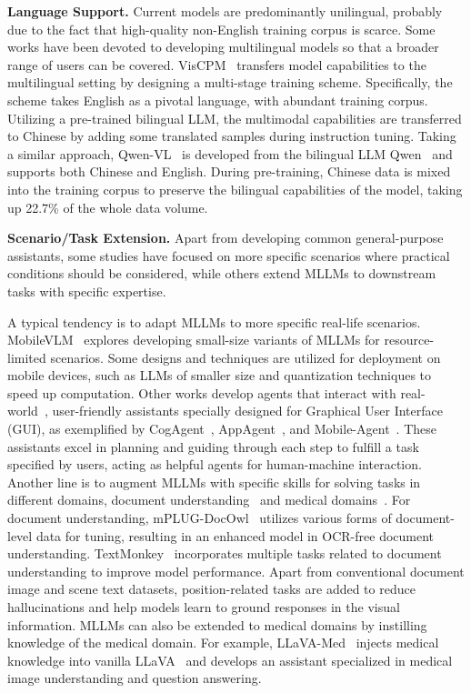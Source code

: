 \noindent \textbf{Language Support.}
Current models are predominantly unilingual, probably due to the fact that high-quality non-English training corpus is scarce. Some works have been devoted to developing multilingual models so that a broader range of users can be covered.
VisCPM~\cite{hu2023large} transfers model capabilities to the multilingual setting by designing a multi-stage training scheme. Specifically, the scheme takes English as a pivotal language, with abundant training corpus. Utilizing a pre-trained bilingual LLM, the multimodal capabilities are transferred to Chinese by adding some translated samples during instruction tuning. 
Taking a similar approach, Qwen-VL~\cite{bai2023qwen} is developed from the bilingual LLM Qwen~\cite{qwen-lm} and supports both Chinese and English. During pre-training, Chinese data is mixed into the training corpus to preserve the bilingual capabilities of the model, taking up 22.7\% of the whole data volume.


\noindent \textbf{Scenario/Task Extension.}
Apart from developing common general-purpose assistants, some studies have focused on more specific scenarios where practical conditions should be considered, while others extend MLLMs to downstream tasks with specific expertise.

A typical tendency is to adapt MLLMs to more specific real-life scenarios. MobileVLM~\cite{chu2023mobilevlm} explores developing small-size variants of MLLMs for resource-limited scenarios. Some designs and techniques are utilized for deployment on mobile devices, such as LLMs of smaller size and quantization techniques to speed up computation.
Other works develop agents that interact with real-world~\cite{gong2023mindagent,huang2023embodied,embodiedgpt}, \eg user-friendly assistants specially designed for Graphical User Interface (GUI), as exemplified by CogAgent~\cite{hong2023cogagent}, AppAgent~\cite{yang2023appagent}, and Mobile-Agent~\cite{wang2024mobile}. These assistants excel in planning and guiding through each step to fulfill a task specified by users, acting as helpful agents for human-machine interaction.
Another line is to augment MLLMs with specific skills for solving tasks in different domains, \eg document understanding~\cite{ye2023mplug,liu2024textmonkey,hu2024mplug,ye2023ureader} and medical domains~\cite{llava-med,pmc-vqa,moor2023med}.
For document understanding, mPLUG-DocOwl~\cite{ye2023mplug} utilizes various forms of document-level data for tuning, resulting in an enhanced model in OCR-free document understanding. TextMonkey~\cite{liu2024textmonkey} incorporates multiple tasks related to document understanding to improve model performance. Apart from conventional document image and scene text datasets, position-related tasks are added to reduce hallucinations and help models learn to ground responses in the visual information.
MLLMs can also be extended to medical domains by instilling knowledge of the medical domain. For example, LLaVA-Med~\cite{li2023llava} injects medical knowledge into vanilla LLaVA~\cite{llava} and develops an assistant specialized in medical image understanding and question answering.
